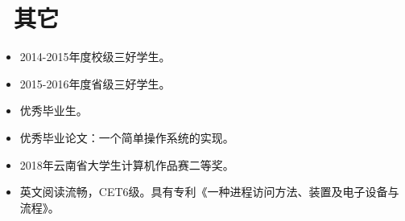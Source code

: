 \documentclass{resume}
\begin{document}
\section{\faInfo\ 其它}
\begin{itemize}[parsep=0.5ex]
  \item 2014-2015年度校级三好学生。
  \item 2015-2016年度省级三好学生。
  \item 优秀毕业生。
  \item 优秀毕业论文：一个简单操作系统的实现。
  \item 2018年云南省大学生计算机作品赛二等奖。
  \item 英文阅读流畅，CET6级。具有专利《一种进程访问方法、装置及电子设备与流程》。
\end{itemize}

%
%
\end{document}
